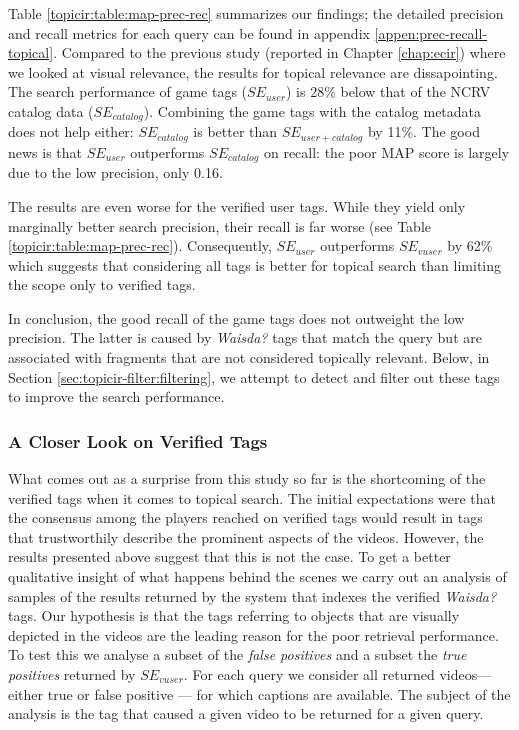 Table \ref{topicir:table:map-prec-rec} summarizes our findings; the detailed precision and recall metrics for each query can be found in appendix \ref{appen:prec-recall-topical}.
Compared to the previous study (reported in Chapter \ref{chap:ecir}) where we looked at visual relevance, the results for topical relevance are dissapointing. The search performance of game tags ($SE_{user}$) is 28\% below that of the NCRV catalog data ($SE_{catalog}$). Combining the game tags with the catalog metadata does not help either: $SE_{catalog}$ is better than $SE_{user+catalog}$ by 11\%. 
The good news is that $SE_{user}$ outperforms $SE_{catalog}$ on recall: the poor MAP score is largely due to the low precision, only 0.16.

The results are even worse for the verified user tags. While they yield only marginally better search precision, their recall is far worse (see Table \ref{topicir:table:map-prec-rec}). Consequently, $SE_{user}$ outperforms $SE_{vuser}$ by 62\% which suggests that considering all tags is better for topical search than limiting the scope only to verified tags.

In conclusion, the good recall of the game tags does not outweight the low precision. The latter is caused by \textit{Waisda?} tags that match the query but are associated with fragments that are not considered topically relevant. Below, in Section \ref{sec:topicir-filter:filtering}, we attempt to detect and filter out these tags to improve the search performance.

\subsubsection{A Closer Look on Verified Tags}\label{topicir:qual-ana}
What comes out as a surprise from this study so far is the shortcoming of the verified tags when it comes to topical search. The initial expectations were that the consensus among the players reached on verified tags would result in tags that trustworthily describe the prominent aspects of the videos. However, the results presented above suggest that this is not the case.  To get a better qualitative insight of what happens behind the scenes we carry out an analysis of samples of the results returned by the system that indexes the verified \textit{Waisda?} tags. Our hypothesis is that the tags referring to objects that are visually depicted in the videos are the leading reason for the poor retrieval performance. To test this we analyse a subset of the \textit{false positives} and a subset the \textit{true positives} returned by $SE_{vuser}$. For each query we consider all returned videos--- either true or false positive --- for which captions are available. The subject of the analysis is the tag that caused a given video to be returned for a given query.

